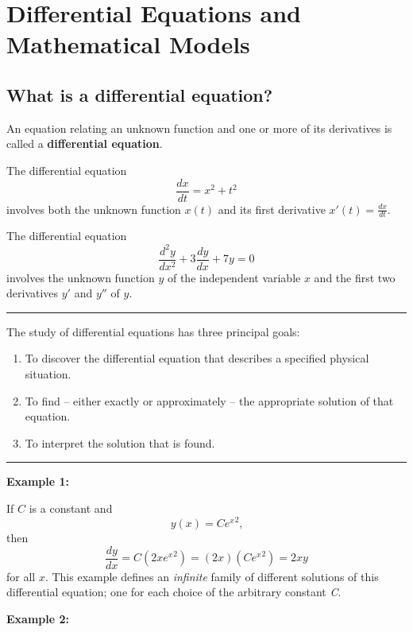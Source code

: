 \documentclass{article}
\begin{document}
\newcommand{\hr}{\par\noindent\rule{\textwidth}{0.4pt}}

\newpage
    \tableofcontents
\newpage

\section{Differential Equations and Mathematical Models}

\subsection{What is a differential equation?}

An equation relating an unknown function and one or more of its derivatives is called a \textbf{differential equation}.

The differential equation
$$ \frac{dx}{dt} = x^2 + t^2 $$
involves both the unknown function $ x(t) $ and its first derivative $ x'(t) = \frac{dx}{dt} $.

The differential equation
$$ \frac{d^2y}{dx^2} + 3\frac{dy}{dx} + 7y = 0 $$
involves the unknown function $ y $ of the independent variable $ x $ and the first two derivatives $ y' $ and $ y'' $ of $ y $.

\par\noindent\rule{\textwidth}{0.4pt}

The study of differential equations has three principal goals:
\begin{enumerate}
    \item To discover the differential equation that describes a specified physical situation.
    \item To find – either exactly or approximately – the appropriate solution of that equation.
    \item To interpret the solution that is found.
\end{enumerate}

\par\noindent\rule{\textwidth}{0.4pt}

\textbf{Example 1:}

If $ C $ is a constant and
$$ y(x) = C{e^x}^{2}\text{,} $$
then
$$ \frac{dy}{dx} = C\left(2x{e^x}^{2}\right) = (2x)\left(C{e^x}^{2}\right) = 2xy $$
for all $ x $. This example defines an \textit{infinite} family of different solutions of this differential equation; one for each choice of the arbitrary constant \textit{C}.

\textbf{Example 2:}
\end{document}
